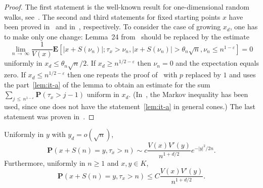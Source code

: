 \documentclass[AHL,Unicode,longabstracts,published]{cedram}
\newcommand{\pr}{\mathbf{P}}
\newcommand{\e}{\mathbf{E}}
\renewcommand{\le}{\leqslant}
\renewcommand{\ge}{\geqslant}
\begin{document}
\begin{proof}
The first statement is the well-known result for one-dimensional random walks, see~\cite[Corollary~3]{Do-12}. The second and third statements for fixed starting points $x$ have been proved in~\cite{DuWa-20} and in~\cite{DeWa-15}, respectively. To consider the case of growing $x_d$, one has to make only one change: Lemma~24 from~\cite{DeWa-15} should be replaced by the estimate
\[
\lim_{n\,\to\,\infty}\frac{1}{V(x)}
\e\left[\left|x+S(\nu_n)\right|;\tau_x>\nu_n,\left|x+S(\nu_n)\right| >\theta_n\sqrt{n},\nu_n\le n^{1-\varepsilon}\right]=0
\]
uniformly in $x_d\le \theta_n\sqrt{n}/2.$ If $x_d\ge n^{1/2-\varepsilon}$ then $\nu_n=0$ and the expectation equals zero. If $x_d\le n^{1/2-\varepsilon}$ then one repeats the proof of~\cite[Lemma~24]{DeWa-15} with $p$ replaced by $1$ and uses the part~\eqref{lem:it-a} of the lemma to obtain an estimate for the sum $\sum_{j\,\le\, n^{1-\varepsilon}}\pr(\tau_x>j-1)$ uniform in $x_d$. (In~\cite{DeWa-15}, the Markov inequality has been used, since one does not have the statement~\eqref{lem:it-a} in general cones.) The last statement was proven in~\cite[Lemma~3]{DeWa-16}.
\end{proof}


\begin{lemm}\label{lem:half-space-2}
Uniformly in $y$ with $y_d=o(\sqrt{n})$,
\[
\pr\left(x+S(n)=y,\tau_x>n\right)\sim c\frac{V(x)V'(y)}{n^{1+d/2}}e^{-|y|^2/2n}.
\]
Furthermore, uniformly in $n\ge1$ and $x,y\in K$,
\[
\pr\left(x+S(n)=y,\tau_x>n\right)
\le C\frac{V(x)V'(y)}{n^{1+d/2}}.
\]
\end{lemm}
\end{document}
